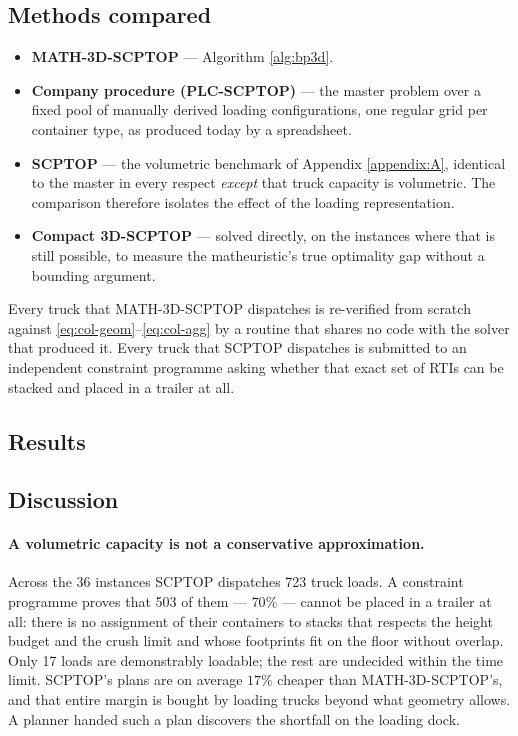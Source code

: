 \subsection{Methods compared}

\begin{itemize}
\item \textbf{MATH-3D-SCPTOP} --- Algorithm \ref{alg:bp3d}.
\item \textbf{Company procedure (PLC-SCPTOP)} --- the master problem
      over a fixed pool of manually derived loading configurations,
      one regular grid per container type, as produced today by a
      spreadsheet.
\item \textbf{SCPTOP} --- the volumetric benchmark of Appendix
      \ref{appendix:A}, identical to the master in every respect
      \emph{except} that truck capacity is volumetric. The comparison
      therefore isolates the effect of the loading representation.
\item \textbf{Compact 3D-SCPTOP} --- solved directly, on the
      instances where that is still possible, to measure the
      matheuristic's true optimality gap without a bounding argument.
\end{itemize}

Every truck that MATH-3D-SCPTOP dispatches is re-verified from
scratch against \eqref{eq:col-geom}--\eqref{eq:col-agg} by a routine
that shares no code with the solver that produced it. Every truck
that SCPTOP dispatches is submitted to an independent constraint
programme asking whether that exact set of RTIs can be stacked and
placed in a trailer at all.

\subsection{Results}



\subsection{Discussion}

\paragraph{A volumetric capacity is not a conservative approximation.}
Across the 36 instances SCPTOP dispatches 723 truck loads. A constraint
programme proves that 503 of them --- $70\%$ --- cannot be placed in a
trailer at all: there is no assignment of their containers to stacks
that respects the height budget and the crush limit and whose
footprints fit on the floor without overlap. Only 17 loads are
demonstrably loadable; the rest are undecided within the time limit.
SCPTOP's plans are on average $17\%$ cheaper than
MATH-3D-SCPTOP's, and that entire margin is bought by loading trucks
beyond what geometry allows. A planner handed such a plan discovers
the shortfall on the loading dock.

